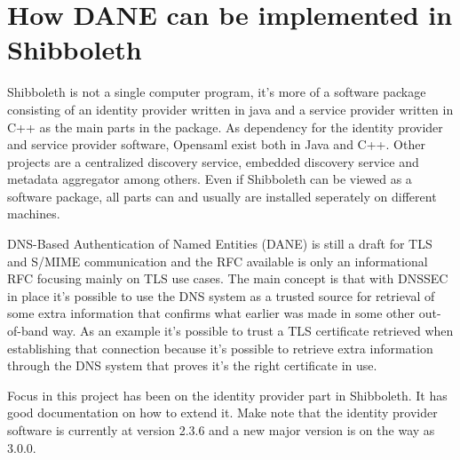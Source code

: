 \section{How DANE can be implemented in Shibboleth}
Shibboleth is not a single computer program, it's more of a software package consisting of an identity provider written in java and a service provider written in C++ as the main parts in the package.
As dependency for the identity provider and service provider software, Opensaml exist both in Java and C++.
Other projects are a centralized discovery service, embedded discovery service and  metadata aggregator among others.
Even if Shibboleth can be viewed as a software package, all parts can and usually are installed seperately on different machines.

DNS-Based Authentication of Named Entities (DANE) is still a draft for TLS and S/MIME communication and the RFC available is only an informational RFC focusing mainly on TLS use cases.
The main concept is that with DNSSEC in place it's possible to use the DNS system as a trusted source for retrieval of some extra information that confirms what earlier was made in some other out-of-band way.
As an example it's possible to trust a TLS certificate retrieved when establishing that connection because it's possible to retrieve extra information through the DNS system that proves it's the right certificate in use.

Focus in this project has been on the identity provider part in Shibboleth.
It has good documentation on how to extend it. 
Make note that the identity provider software is currently at version 2.3.6 and a new major version is on the way as 3.0.0.










